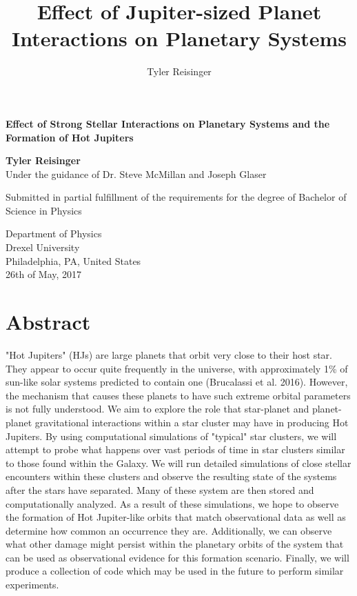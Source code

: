 \documentclass[12pt]{article}
\author{Tyler Reisinger}
\title{Effect of Jupiter-sized Planet Interactions on Planetary Systems}
\date{}
\begin{document}
\begin{titlepage}
    \begin{center}
        \vspace*{1cm}
        
        \textbf{Effect of Strong Stellar Interactions on Planetary Systems and
            the Formation of Hot Jupiters}
        
        \vspace{1.5cm}
        
        \textbf{Tyler Reisinger}\\
        Under the guidance of Dr. Steve McMillan and Joseph Glaser
        
        \vfill
        
        Submitted in partial fulfillment of the requirements for the
        degree of Bachelor of Science in Physics
        
        \vspace{0.8cm}

        Department of Physics \\
        Drexel University \\
        Philadelphia, PA, United States\\
        26th of May, 2017 
    \end{center}
\end{titlepage}

\tableofcontents

\clearpage

\section{Abstract}

"Hot Jupiters" (HJs) are large planets that orbit very close to their host star. 
They appear to occur quite frequently in the universe, with approximately 1\% 
of sun-like solar systems predicted to contain one (Brucalassi et al. 2016). 
However, the mechanism that causes these planets to have such extreme orbital parameters
is not fully understood. 
We aim to explore the role that star-planet and planet-planet gravitational interactions 
within a star cluster may have in producing Hot 
Jupiters. By using computational simulations of "typical" star clusters,
we will attempt to probe what happens over vast periods of time
in star clusters similar to those found within the Galaxy.
We will run detailed simulations of close stellar encounters within these clusters
and observe the resulting state of the systems after the stars have separated. Many
of these system are then stored and computationally analyzed. 
As a result of these simulations, 
we hope to observe the formation of Hot Jupiter-like orbits that
match observational data as well as determine how common an occurrence they are.
Additionally, we can observe what other damage might 
persist within the planetary orbits of the system that can be used as 
observational evidence for this formation scenario. Finally, we will
produce a collection of code which may be used in the future to perform similar
experiments.
\end{document}
